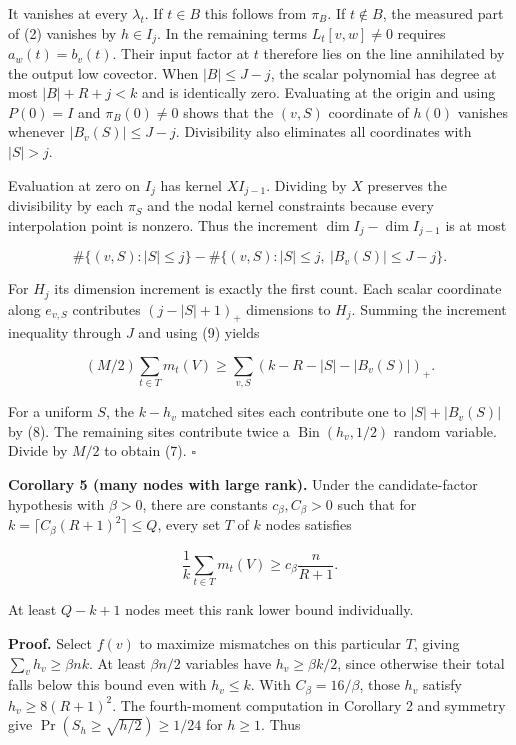 \documentclass[
  10pt,
]{article}
\begin{document}
It vanishes at every \(\lambda_t\). If \(t\in B\) this follows from
\(\pi_B\). If \(t\notin B\), the measured part of (2) vanishes by
\(h\in I_j\). In the remaining terms \(L_t[v,w]\ne0\) requires
\(a_w(t)=b_v(t)\). Their input factor at \(t\) therefore lies on the
line annihilated by the output low covector. When \(|B|\le J-j\), the
scalar polynomial has degree at most \(|B|+R+j<k\) and is identically
zero. Evaluating at the origin and using \(P(0)=I\) and \(\pi_B(0)\ne0\)
shows that the \((v,S)\) coordinate of \(h(0)\) vanishes whenever
\(|B_v(S)|\le J-j\). Divisibility also eliminates all coordinates with
\(|S|>j\).

Evaluation at zero on \(I_j\) has kernel \(XI_{j-1}\). Dividing by \(X\)
preserves the divisibility by each \(\pi_S\) and the nodal kernel
constraints because every interpolation point is nonzero. Thus the
increment \(\dim I_j-\dim I_{j-1}\) is at most

\[
 \#\{(v,S):|S|\le j\}
 -\#\{(v,S):|S|\le j,\ |B_v(S)|\le J-j\}.
\]

For \(H_j\) its dimension increment is exactly the first count. Each
scalar coordinate along \(e_{v,S}\) contributes \((j-|S|+1)_+\)
dimensions to \(H_j\). Summing the increment inequality through \(J\)
and using (9) yields

\[
 (M/2)\sum_{t\in T}m_t(V)
      \ge \sum_{v,S}(k-R-|S|-|B_v(S)|)_+ .
\]

For a uniform \(S\), the \(k-h_v\) matched sites each contribute one to
\(|S|+|B_v(S)|\) by (8). The remaining sites contribute twice a
\(\operatorname{Bin}(h_v,1/2)\) random variable. Divide by \(M/2\) to
obtain (7). \(\square\)

\textbf{Corollary 5 (many nodes with large rank).} Under the
candidate-factor hypothesis with \(\beta>0\), there are constants
\(c_\beta,C_\beta>0\) such that for
\(k=\lceil C_\beta(R+1)^2\rceil\le Q\), every set \(T\) of \(k\) nodes
satisfies

\[
                    \frac1k\sum_{t\in T}m_t(V)
                      \ge c_\beta\frac{n}{R+1}.                       \tag{10}
\]

At least \(Q-k+1\) nodes meet this rank lower bound individually.

\textbf{Proof.} Select \(f(v)\) to maximize mismatches on this
particular \(T\), giving \(\sum_v h_v\ge\beta nk\). At least
\(\beta n/2\) variables have \(h_v\ge\beta k/2\), since otherwise their
total falls below this bound even with \(h_v\le k\). With
\(C_\beta=16/\beta\), those \(h_v\) satisfy \(h_v\ge8(R+1)^2\). The
fourth-moment computation in Corollary 2 and symmetry give
\(\Pr(S_h\ge\sqrt{h/2})\ge1/24\) for \(h\ge1\). Thus
\end{document}
